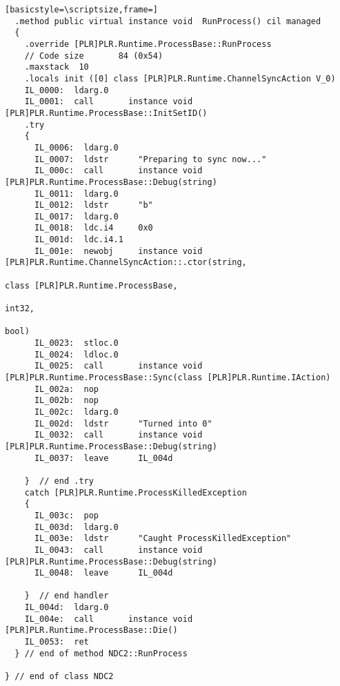 \begin{lstlisting}[basicstyle=\scriptsize,frame=]
  .method public virtual instance void  RunProcess() cil managed
  {
    .override [PLR]PLR.Runtime.ProcessBase::RunProcess
    // Code size       84 (0x54)
    .maxstack  10
    .locals init ([0] class [PLR]PLR.Runtime.ChannelSyncAction V_0)
    IL_0000:  ldarg.0
    IL_0001:  call       instance void [PLR]PLR.Runtime.ProcessBase::InitSetID()
    .try
    {
      IL_0006:  ldarg.0
      IL_0007:  ldstr      "Preparing to sync now..."
      IL_000c:  call       instance void [PLR]PLR.Runtime.ProcessBase::Debug(string)
      IL_0011:  ldarg.0
      IL_0012:  ldstr      "b"
      IL_0017:  ldarg.0
      IL_0018:  ldc.i4     0x0
      IL_001d:  ldc.i4.1
      IL_001e:  newobj     instance void [PLR]PLR.Runtime.ChannelSyncAction::.ctor(string,
                                                                                   class [PLR]PLR.Runtime.ProcessBase,
                                                                                   int32,
                                                                                   bool)
      IL_0023:  stloc.0
      IL_0024:  ldloc.0
      IL_0025:  call       instance void [PLR]PLR.Runtime.ProcessBase::Sync(class [PLR]PLR.Runtime.IAction)
      IL_002a:  nop
      IL_002b:  nop
      IL_002c:  ldarg.0
      IL_002d:  ldstr      "Turned into 0"
      IL_0032:  call       instance void [PLR]PLR.Runtime.ProcessBase::Debug(string)
      IL_0037:  leave      IL_004d

    }  // end .try
    catch [PLR]PLR.Runtime.ProcessKilledException 
    {
      IL_003c:  pop
      IL_003d:  ldarg.0
      IL_003e:  ldstr      "Caught ProcessKilledException"
      IL_0043:  call       instance void [PLR]PLR.Runtime.ProcessBase::Debug(string)
      IL_0048:  leave      IL_004d

    }  // end handler
    IL_004d:  ldarg.0
    IL_004e:  call       instance void [PLR]PLR.Runtime.ProcessBase::Die()
    IL_0053:  ret
  } // end of method NDC2::RunProcess

} // end of class NDC2


\end{lstlisting}
